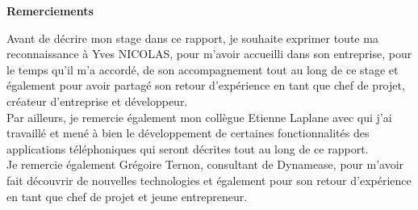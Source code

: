 \begin{center}
        \Huge{\bf Remerciements}\\[1.5cm]
\end{center}

Avant de décrire mon stage dans ce rapport, je souhaite exprimer toute ma reconnaissance à Yves NICOLAS, pour m’avoir accueilli dans son entreprise, pour le temps qu’il m’a accordé, de son accompagnement tout au long de ce stage et également pour avoir partagé son retour d'expérience en tant que chef de projet, créateur d'entreprise et développeur.\\

Par ailleurs, je remercie également mon collègue Etienne Laplane avec qui j’ai travaillé et mené à bien le développement de certaines fonctionnalités des applications téléphoniques qui seront décrites tout au long de ce rapport.\\

Je remercie également Grégoire Ternon, consultant de Dynamease, pour m'avoir fait découvrir de nouvelles technologies et également pour son retour d'expérience en tant que chef de projet et jeune entrepreneur. 